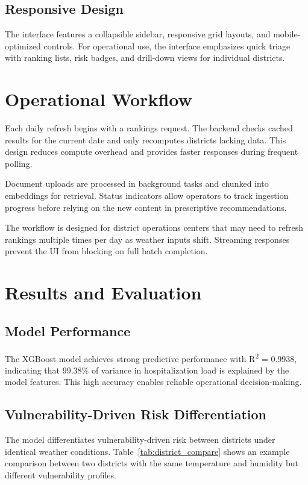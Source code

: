 \documentclass[conference]{IEEEtran}
\begin{document}
\subsection{Responsive Design}
The interface features a collapsible sidebar, responsive grid layouts, and mobile-optimized controls. For operational use, the interface emphasizes quick triage with ranking lists, risk badges, and drill-down views for individual districts.

\section{Operational Workflow}
\label{sec:workflow}

Each daily refresh begins with a rankings request. The backend checks cached results for the current date and only recomputes districts lacking data. This design reduces compute overhead and provides faster responses during frequent polling.

Document uploads are processed in background tasks and chunked into embeddings for retrieval. Status indicators allow operators to track ingestion progress before relying on the new content in prescriptive recommendations.

The workflow is designed for district operations centers that may need to refresh rankings multiple times per day as weather inputs shift. Streaming responses prevent the UI from blocking on full batch completion.

\section{Results and Evaluation}
\label{sec:results}

\subsection{Model Performance}
The XGBoost model achieves strong predictive performance with R\textsuperscript{2} = 0.9938, indicating that 99.38\% of variance in hospitalization load is explained by the model features. This high accuracy enables reliable operational decision-making.

\subsection{Vulnerability-Driven Risk Differentiation}
The model differentiates vulnerability-driven risk between districts under identical weather conditions. Table~\ref{tab:district_compare} shows an example comparison between two districts with the same temperature and humidity but different vulnerability profiles.
\end{document}
